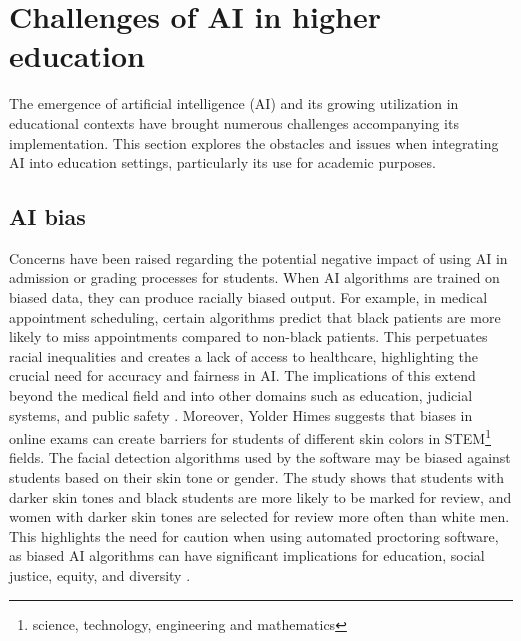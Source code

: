 \section{Challenges of AI in higher education}
The emergence of artificial intelligence (AI) and its growing utilization in educational 
contexts have brought numerous challenges accompanying its implementation.  This section explores the obstacles 
and issues when integrating AI into education settings, particularly its use for academic purposes.
\subsection{AI bias}
Concerns have been raised regarding the potential negative impact of using AI in admission or grading processes for students. 
When AI algorithms are trained on biased data, they can produce racially biased output. For example, in medical appointment 
scheduling, certain algorithms predict that black patients are more likely to miss appointments compared to non-black patients. 
This perpetuates racial inequalities and creates a lack of access to healthcare, highlighting the crucial need for accuracy and 
fairness in AI. The implications of this extend beyond the medical field and into other domains 
such as education, judicial systems, and public safety \citep{shanklin_ethical_2022}. 
 Moreover, Yolder Himes suggests that biases in online exams can create barriers for students of different skin colors in STEM\footnote{science, technology, engineering and mathematics} 
fields.  The facial detection algorithms used by the software may be biased against students based on their skin tone or gender. The study shows 
that students with darker skin tones and black students are more likely to be marked for review, and women with darker skin tones are 
selected for review more often than white men. This highlights the need for caution when using automated proctoring software, as biased 
AI algorithms can have significant implications for education, social justice, equity, and diversity \citep{yoder-himes_racial_2022}. 


